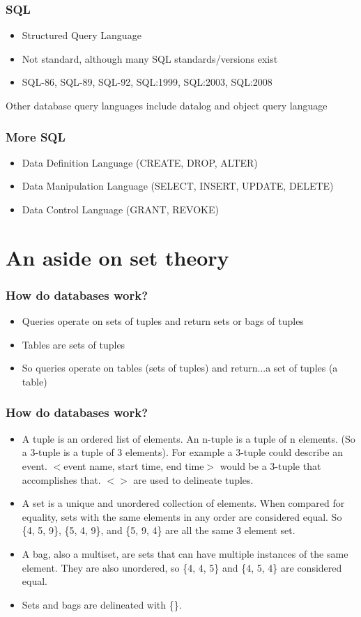 \documentclass{beamer}
\begin{document}
\begin{frame}
  \frametitle{SQL}
  \begin{itemize}
    \item Structured Query Language
    \item Not standard, although many SQL standards/versions exist
    \item SQL-86, SQL-89, SQL-92, SQL:1999, SQL:2003, SQL:2008
  \end{itemize}
	Other database query languages include datalog and object query language
\end{frame}

\begin{frame}
  \frametitle{More SQL}
  \begin{itemize}
    \item Data Definition Language (CREATE, DROP, ALTER)
    \item Data Manipulation Language (SELECT, INSERT, UPDATE, DELETE)
    \item Data Control Language (GRANT, REVOKE)
  \end{itemize}
\end{frame}

\section{An aside on set theory}

\begin{frame}
  \frametitle{How do databases work?}
  \begin{itemize}
	\item Queries operate on sets of tuples and return sets or bags of tuples
	\item Tables are sets of tuples
	\item So queries operate on tables (sets of tuples) and return...a set of tuples (a table)
  \end{itemize}
\end{frame}

\begin{frame}
  \frametitle{How do databases work?}
  \begin{itemize}
	\item A tuple is an ordered list of elements. An n-tuple is a tuple of n elements. (So a 3-tuple is a tuple of 3 elements). For example a 3-tuple could describe an event. $<$event name, start time, end time$>$ would be a 3-tuple that accomplishes that. $<>$ are used to delineate tuples.
	\item A set is a unique and unordered collection of elements. When compared for equality, sets with the same elements in any order are considered equal. So \{4, 5, 9\}, \{5, 4, 9\}, and \{5, 9, 4\} are all the same 3 element set.
	\item A bag, also a multiset, are sets that can have multiple instances of the same element. They are also unordered, so \{4, 4, 5\} and \{4, 5, 4\} are considered equal.
	\item Sets and bags are delineated with \{\}.
  \end{itemize}
\end{frame}
\end{document}
